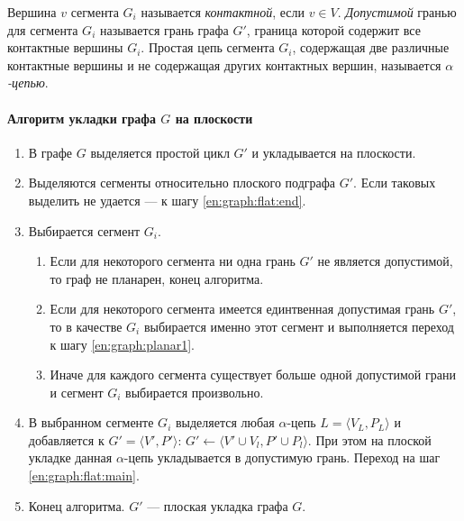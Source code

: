 Вершина $v$ сегмента $G_i$ называется \emph{контактной}, если $v\in V$. \emph{Допустимой} гранью для сегмента $G_i$ называется грань графа $G'$, граница которой содержит все контактные вершины $G_i$. Простая цепь сегмента $G_i$, содержащая две различные контактные вершины и не содержащая других контактных вершин, называется \emph{$\alpha$-цепью}.

\paragraph{Алгоритм укладки графа $G$ на плоскости}
\begin{enumerate}
    \item В графе $G$ выделяется простой цикл $G'$ и укладывается на плоскости.
    \item \label{en:graph:flat:main} Выделяются сегменты относительно плоского подграфа $G'$. Если таковых выделить не удается --- к шагу \ref{en:graph:flat:end}.
    \item Выбирается сегмент $G_i$. 
    \begin{enumerate}
        \item Если для некоторого сегмента ни одна грань $G'$ не является допустимой, то граф не планарен, конец алгоритма. 
        \item Если для некоторого сегмента имеется единтвенная допустимая грань $G'$, то в качестве $G_i$ выбирается именно этот сегмент и выполняется переход к шагу \ref{en:graph:planar1}.
        \item Иначе для каждого сегмента существует больше одной допустимой грани и сегмент $G_i$ выбирается произвольно.
    \end{enumerate}
    \item\label{en:graph:planar1} В выбранном сегменте $G_i$ выделяется любая $\alpha$-цепь $L=\langle V_L,P_L\rangle$ и добавляется к $G'=\langle V',P'\rangle$: $G'\gets\langle V'\cup V_l, P'\cup P_l\rangle$. При этом на плоской укладке данная $\alpha$-цепь укладывается в допустимую грань. Переход на шаг \ref{en:graph:flat:main}.
    \item \label{en:graph:flat:end} Конец алгоритма. $G'$ --- плоская укладка графа $G$.
\end{enumerate}


